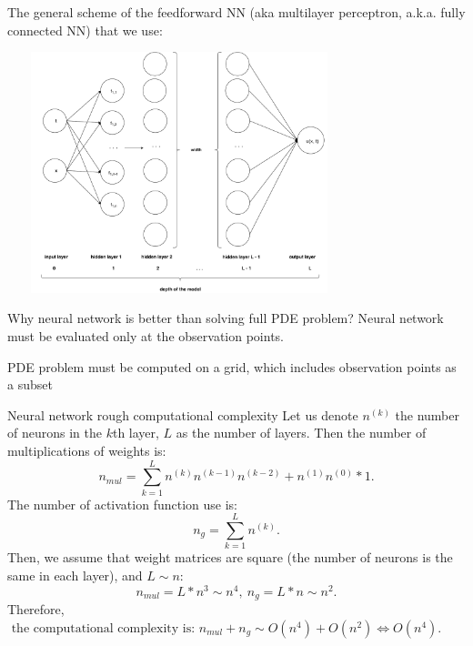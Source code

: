 \documentclass{beamer}
\begin{document}
\begin{frame}
The general scheme of the feedforward NN (aka multilayer perceptron, a.k.a. fully connected NN) that we use:

\vspace{0.5cm}
\centering
\includegraphics[width = 10cm , height = 7cm]{images/FFNN}
\end{frame}

\begin{frame}{Why neural network is better than solving full PDE problem?}
Neural network must be evaluated only at the observation points.

PDE problem must be computed on a grid, which includes observation points as a subset
\end{frame}

\begin{frame}{Neural network rough computational complexity}
    Let us denote $n^{(k)}$ the number of neurons in the $k$th layer, $L$ as the number of layers. Then the number of multiplications of weights is: $$n_{mul} = \sum_{k=1}^{L} n^{(k)} n^{(k-1)} n^{(k-2)} + n^{(1)}n^{(0)}*1.$$
    The number of activation function use is: $$n_g = \sum_{k = 1}^{L} n^{(k)}.$$     
    Then, we assume that weight matrices are square (the number of neurons is the same in each layer), and $L \sim n$:
    $$n_{mul} = L*n^3 \sim n^4, ~ n_g = L*n \sim n^2.$$
    Therefore, $ \text{ the computational complexity is: }  n_{mul} + n_g \sim O(n^4) + O(n^2) \Longleftrightarrow O(n^4).$ 
\end{frame}
\end{document}
